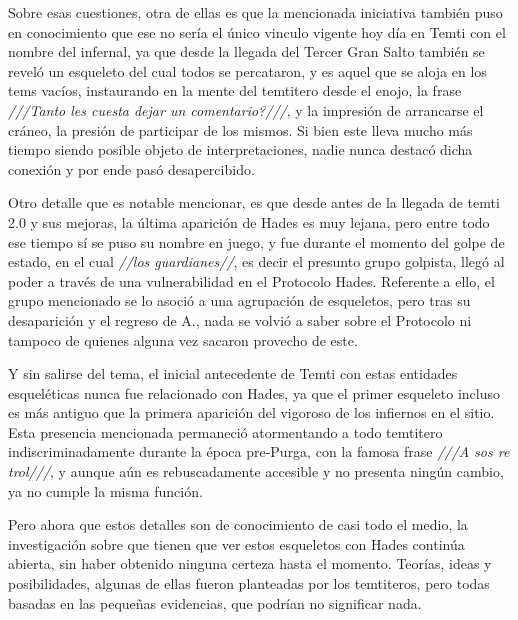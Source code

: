 \documentclass[
  spanish,
]{book}
\begin{document}
Sobre esas cuestiones, otra de ellas es que la mencionada iniciativa también puso en conocimiento que ese no sería el único vinculo vigente hoy día en Temti con el nombre del infernal, ya que desde la llegada del Tercer Gran Salto también se reveló un esqueleto del cual todos se percataron, y es aquel que se aloja en los tems vacíos, instaurando en la mente del temtitero desde el enojo, la frase \emph{///Tanto les cuesta dejar un comentario?///}, y la impresión de arrancarse el cráneo, la presión de participar de los mismos. Si bien este lleva mucho más tiempo siendo posible objeto de interpretaciones, nadie nunca destacó dicha conexión y por ende pasó desapercibido.

Otro detalle que es notable mencionar, es que desde antes de la llegada de temti 2.0 y sus mejoras, la última aparición de Hades es muy lejana, pero entre todo ese tiempo sí se puso su nombre en juego, y fue durante el momento del golpe de estado, en el cual \emph{//los guardianes//}, es decir el presunto grupo golpista, llegó al poder a través de una vulnerabilidad en el Protocolo Hades. Referente a ello, el grupo mencionado se lo asoció a una agrupación de esqueletos, pero tras su desaparición y el regreso de A., nada se volvió a saber sobre el Protocolo ni tampoco de quienes alguna vez sacaron provecho de este.

Y sin salirse del tema, el inicial antecedente de Temti con estas entidades esqueléticas nunca fue relacionado con Hades, ya que el primer esqueleto incluso es más antiguo que la primera aparición del vigoroso de los infiernos en el sitio. Esta presencia mencionada permaneció atormentando a todo temtitero indiscriminadamente durante la época pre-Purga, con la famosa frase \emph{///A sos re trol///}, y aunque aún es rebuscadamente accesible y no presenta ningún cambio, ya no cumple la misma función.

Pero ahora que estos detalles son de conocimiento de casi todo el medio, la investigación sobre que tienen que ver estos esqueletos con Hades continúa abierta, sin haber obtenido ninguna certeza hasta el momento. Teorías, ideas y posibilidades, algunas de ellas fueron planteadas por los temtiteros, pero todas basadas en las pequeñas evidencias, que podrían no significar nada.
\end{document}
